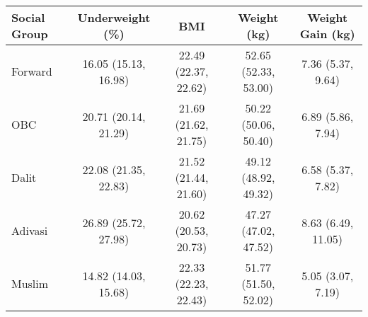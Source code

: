 \begin{tabular}{lcccc}
\toprule
Social Group & Underweight (\%) & BMI & Weight (kg) & Weight Gain (kg) \\
\midrule
Forward&16.05 (15.13, 16.98)&22.49 (22.37, 22.62)&52.65 (52.33, 53.00)&7.36 (5.37, 9.64)\\
OBC&20.71 (20.14, 21.29)&21.69 (21.62, 21.75)&50.22 (50.06, 50.40)&6.89 (5.86, 7.94)\\
Dalit&22.08 (21.35, 22.83)&21.52 (21.44, 21.60)&49.12 (48.92, 49.32)&6.58 (5.37, 7.82)\\
Adivasi&26.89 (25.72, 27.98)&20.62 (20.53, 20.73)&47.27 (47.02, 47.52)&8.63 (6.49, 11.05)\\
Muslim&14.82 (14.03, 15.68)&22.33 (22.23, 22.43)&51.77 (51.50, 52.02)&5.05 (3.07, 7.19)\\
\bottomrule
\end{tabular}
